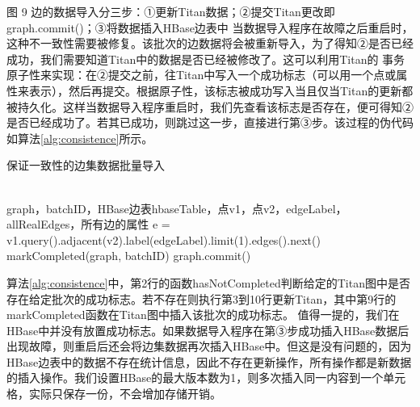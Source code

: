 图 9	边的数据导入分三步：①更新Titan数据；②提交Titan更改即graph.commit()；③将数据插入HBase边表中
当数据导入程序在故障之后重启时，这种不一致性需要被修复。该批次的边数据将会被重新导入，为了得知②是否已经成功，我们需要知道Titan中的数据是否已经被修改了。这可以利用Titan的
事务原子性来实现：在②提交之前，往Titan中写入一个成功标志（可以用一个点或属性来表示），然后再提交。根据原子性，该标志被成功写入当且仅当Titan的更新都被持久化。这样当数据导入程序重启时，我们先查看该标志是否存在，便可得知②是否已经成功了。若其已成功，则跳过这一步，直接进行第③步。该过程的伪代码如算法\ref{alg:consistence}所示。
\begin{algorithm}
\caption{保证一致性的边集数据批量导入}
\label{alg:consistence}
\begin{algorithmic}[1] %
\REQUIRE ~~\\
graph，batchID，HBase边表hbaseTable，点v1，点v2，edgeLabel，allRealEdges，所有边的属性
\STATE e = v1.query().adjacent(v2).label(edgeLabel).limit(1).edges().next()
	\ENDIF
	\ENDFOR
	\STATE markCompleted(graph, batchID)
	\STATE graph.commit()
\ENDIF
{}
\ENDFOR
\end{algorithmic} 
\end{algorithm}

算法\ref{alg:consistence}中，第2行的函数hasNotCompleted判断给定的Titan图中是否存在给定批次的成功标志。若不存在则执行第3到10行更新Titan，其中第9行的markCompleted函数在Titan图中插入该批次的成功标志。
值得一提的，我们在HBase中并没有放置成功标志。如果数据导入程序在第③步成功插入HBase数据后出现故障，则重启后还会将边集数据再次插入HBase中。但这是没有问题的，因为HBase边表中的数据不存在统计信息，因此不存在更新操作，所有操作都是新数据的插入操作。我们设置HBase的最大版本数为1，则多次插入同一内容到一个单元格，实际只保存一份，不会增加存储开销。



